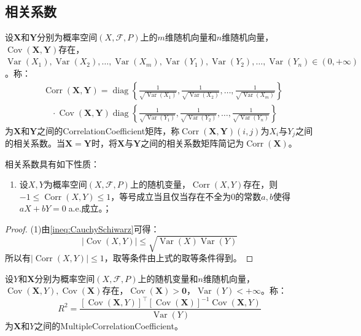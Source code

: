 \subsection{相关系数}
\begin{definition}
	设$\mathbf{X}$和$\mathbf{Y}$分别为概率空间$(X,\mathscr{F},P)$上的$m$维随机向量和$n$维随机向量，$\operatorname{Cov}(\mathbf{X},\mathbf{Y})$存在，$\operatorname{Var}(X_1),\operatorname{Var}(X_2),\dots,\operatorname{Var}(X_m),\operatorname{Var}(Y_1),\operatorname{Var}(Y_2),\dots,\operatorname{Var}(Y_n)\in(0,+\infty)$。称：
	\begin{align*}
		&\operatorname{Corr}(\mathbf{X},\mathbf{Y})=\operatorname{diag}\left\{\frac{1}{\sqrt{\operatorname{Var}(X_1)}},\frac{1}{\sqrt{\operatorname{Var}(X_2)}},\dots,\frac{1}{\sqrt{\operatorname{Var}(X_m)}}\right\} \\
		&\quad\cdot\operatorname{Cov}(\mathbf{X},\mathbf{Y})\operatorname{diag}\left\{\frac{1}{\sqrt{\operatorname{Var}(Y_1)}},\frac{1}{\sqrt{\operatorname{Var}(Y_2)}},\dots,\frac{1}{\sqrt{\operatorname{Var}(Y_n)}}\right\}
	\end{align*}
	为$\mathbf{X}$和$\mathbf{Y}$之间的\gls{CorrelationCoefficient}矩阵，称$\operatorname{Corr}(\mathbf{X},\mathbf{Y})(i,j)$为$X_i$与$Y_j$之间的相关系数。当$\mathbf{X}=\mathbf{Y}$时，将$\mathbf{X}$与$\mathbf{Y}$之间的相关系数矩阵简记为$\operatorname{Corr}(\mathbf{X})$。
\end{definition}
\begin{property}\label{prop:CorrelationCoefficient}
	相关系数具有如下性质：
	\begin{enumerate}
		\item 设$X,Y$为概率空间$(X,\mathscr{F},P)$上的随机变量，$\operatorname{Corr}(X,Y)$存在，则$-1\leqslant\operatorname{Corr}(X,Y)\leqslant1$，等号成立当且仅当存在不全为$0$的常数$a,b$使得$aX+bY=0\;$a.e.成立。；
	\end{enumerate}
\end{property}
\begin{proof}
	(1)由\cref{ineq:CauchySchiwarz}可得：
	\begin{equation*}
		|\operatorname{Cov}(X,Y)|\leqslant\sqrt{\operatorname{Var}(X)\operatorname{Var}(Y)}
	\end{equation*}
	所以有$|\operatorname{Corr}(X,Y)|\leqslant1$，取等条件由上式的取等条件得到。
\end{proof}
\begin{definition}
	设$Y$和$\mathbf{X}$分别为概率空间$(X,\mathscr{F},P)$上的随机变量和$n$维随机向量，$\operatorname{Cov}(\mathbf{X},Y),\operatorname{Cov}(\mathbf{X})$存在，$\operatorname{Cov}(\mathbf{X})>\mathbf{0}$，$\operatorname{Var}(Y)<+\infty$。称：
	\begin{equation*}
		R^2=\frac{[\operatorname{Cov}(\mathbf{X},Y)]^{\top}[\operatorname{Cov}(\mathbf{X})]^{-1}\operatorname{Cov}(\mathbf{X},Y)}{\operatorname{Var}(Y)}
	\end{equation*}
	为$\mathbf{X}$和$Y$之间的\gls{MultipleCorrelationCoefficient}。
\end{definition}
